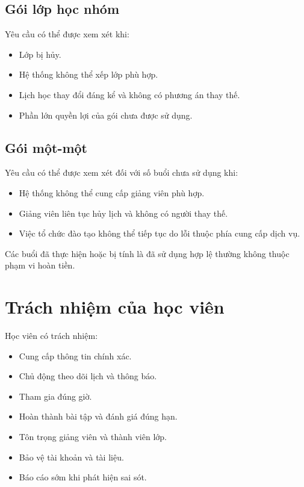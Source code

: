 \documentclass[12pt,a4paper]{article}
\begin{document}
\subsection{Gói lớp học nhóm}

Yêu cầu có thể được xem xét khi:

\begin{itemize}
    \item Lớp bị hủy.
    \item Hệ thống không thể xếp lớp phù hợp.
    \item Lịch học thay đổi đáng kể và không có phương án thay thế.
    \item Phần lớn quyền lợi của gói chưa được sử dụng.
\end{itemize}

\subsection{Gói một-một}

Yêu cầu có thể được xem xét đối với số buổi chưa sử dụng khi:

\begin{itemize}
    \item Hệ thống không thể cung cấp giảng viên phù hợp.
    \item Giảng viên liên tục hủy lịch và không có người thay thế.
    \item Việc tổ chức đào tạo không thể tiếp tục do lỗi thuộc phía cung cấp dịch vụ.
\end{itemize}

Các buổi đã thực hiện hoặc bị tính là đã sử dụng hợp lệ
thường không thuộc phạm vi hoàn tiền.

\section{Trách nhiệm của học viên}

Học viên có trách nhiệm:

\begin{itemize}
    \item Cung cấp thông tin chính xác.
    \item Chủ động theo dõi lịch và thông báo.
    \item Tham gia đúng giờ.
    \item Hoàn thành bài tập và đánh giá đúng hạn.
    \item Tôn trọng giảng viên và thành viên lớp.
    \item Bảo vệ tài khoản và tài liệu.
    \item Báo cáo sớm khi phát hiện sai sót.
\end{itemize}
\end{document}
